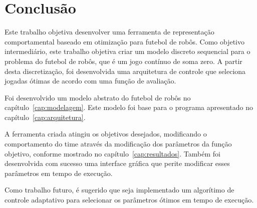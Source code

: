 \chapter*{Conclusão}\label{cap:conclusao}

Este trabalho objetiva desenvolver uma ferramenta de representação
comportamental baseado em otimização para futebol de robôs.
Como objetivo intermediário, este trabalho objetiva criar um modelo discreto
sequencial para o problema do futebol de robôs, que é um jogo contínuo de soma
zero. A partir desta discretização, foi desenvolvida uma arquitetura de
controle que seleciona jogadas ótimas de acordo com uma função de avaliação.

Foi desenvolvido um modelo abstrato do futebol de robôs no
capítulo~\ref{cap:modelagem}. Este modelo foi base para o
programa apresentado no capítulo~\ref{cap:arquitetura}.

A ferramenta criada atingiu os objetivos desejados, modificando o
comportamento do time através da modificação dos parâmetros da função
objetivo, conforme mostrado no capítulo~\ref{cap:resultados}. Também foi
desenvolvida com sucesso uma interface gráfica que perite modificar
esses parâmetros em tempo de execução.

Como trabalho futuro, é sugerido que seja implementado 
um algorítimo de controle adaptativo para selecionar os
parâmetros ótimos em tempo de execução.

